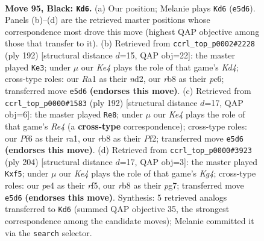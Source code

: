 \documentclass[11pt]{article}
\begin{document}
\clearpage

\begin{figure}[p]\centering
\begin{subfigure}{0.46\textwidth}\centering
\resizebox{\linewidth}{!}{%
\newchessgame
\chessboard[
  setfen={1R6/7R/4pp2/4k3/4P3/5PK1/8/r7 b - - 3 95},
  showmover=false,
  pgfstyle=straightmove, color=movearrow, markmove={e5-d6}
]}
\caption{}
\end{subfigure}\hfill
\begin{subfigure}{0.46\textwidth}\centering
\resizebox{\linewidth}{!}{%
\newchessgame
\chessboard[
  setfen={7R/4k3/2p1p3/2PpP3/3K4/8/3n4/8 w - - 82 97},
  showmover=false,
  pgfstyle=straightmove, color=movearrow, markmove={d4-e3}
]}
\caption{}
\end{subfigure}
\\[4pt]
\begin{subfigure}{0.46\textwidth}\centering
\resizebox{\linewidth}{!}{%
\newchessgame
\chessboard[
  setfen={8/8/8/6pk/4R1p1/6P1/5PK1/r7 w - - 24 97},
  showmover=false,
  pgfstyle=straightmove, color=movearrow, markmove={e4-e8}
]}
\caption{}
\end{subfigure}\hfill
\begin{subfigure}{0.46\textwidth}\centering
\resizebox{\linewidth}{!}{%
\newchessgame
\chessboard[
  setfen={7k/6p1/7p/5r1P/6K1/6P1/8/8 w - - 0 103},
  showmover=false,
  pgfstyle=straightmove, color=movearrow, markmove={g4-f5}
]}
\caption{}
\end{subfigure}
\caption{\textbf{Move 95, Black: \texttt{Kd6}.} (a) Our position; Melanie plays \texttt{Kd6} (\texttt{e5d6}). Panels (b)--(d) are the retrieved master positions whose correspondence most drove this move (highest QAP objective among those that transfer to it). (b) Retrieved from \texttt{ccrl\_top\_p0002\#2228} (ply 192) [structural distance $d$=15, QAP obj=22]: the master played \texttt{Ke3}; under $\mu$ our \emph{Ke4} plays the role of that game's \emph{Kd4}; cross-type roles: our \emph{R}a1 as their \emph{n}d2, our \emph{r}b8 as their \emph{p}c6; transferred move \texttt{e5d6} \textbf{(endorses this move)}. (c) Retrieved from \texttt{ccrl\_top\_p0000\#1583} (ply 192) [structural distance $d$=17, QAP obj=6]: the master played \texttt{Re8}; under $\mu$ our \emph{Ke4} plays the role of that game's \emph{Re4} (a \textbf{cross-type} correspondence); cross-type roles: our \emph{P}f6 as their \emph{r}a1, our \emph{r}b8 as their \emph{P}f2; transferred move \texttt{e5d6} \textbf{(endorses this move)}. (d) Retrieved from \texttt{ccrl\_top\_p0000\#3923} (ply 204) [structural distance $d$=17, QAP obj=3]: the master played \texttt{Kxf5}; under $\mu$ our \emph{Ke4} plays the role of that game's \emph{Kg4}; cross-type roles: our \emph{p}e4 as their \emph{r}f5, our \emph{r}b8 as their \emph{p}g7; transferred move \texttt{e5d6} \textbf{(endorses this move)}. Synthesis: 5 retrieved analogs transferred to \texttt{Kd6} (summed QAP objective 35, the strongest correspondence among the candidate moves); Melanie committed it via the \texttt{search} selector.}
\label{fig:thought-m189}
\end{figure}
\end{document}
